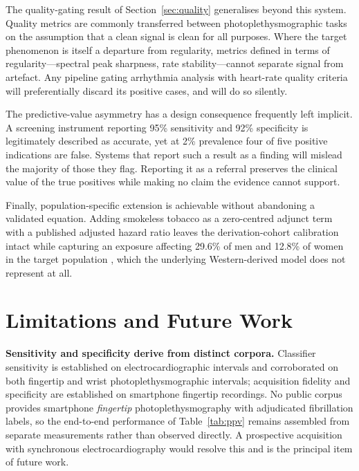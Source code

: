 \documentclass[conference]{IEEEtran}
\begin{document}
The quality-gating result of Section~\ref{sec:quality} generalises beyond this
system. Quality metrics are commonly transferred between photoplethysmographic
tasks on the assumption that a clean signal is clean for all purposes. Where the
target phenomenon is itself a departure from regularity, metrics defined in terms
of regularity---spectral peak sharpness, rate stability---cannot separate signal from
artefact. Any pipeline gating arrhythmia analysis with heart-rate quality criteria
will preferentially discard its positive cases, and will do so silently.

The predictive-value asymmetry has a design consequence frequently left implicit.
A screening instrument reporting 95\% sensitivity and 92\% specificity is
legitimately described as accurate, yet at 2\% prevalence four of five positive
indications are false. Systems that report such a result as a finding will
mislead the majority of those they flag. Reporting it as a referral preserves the
clinical value of the true positives while making no claim the evidence cannot
support.

Finally, population-specific extension is achievable without abandoning a validated
equation. Adding smokeless tobacco as a zero-centred adjunct term with a published
adjusted hazard ratio leaves the derivation-cohort calibration intact while
capturing an exposure affecting 29.6\% of men and 12.8\% of women in the target
population \cite{gats2017}, which the underlying Western-derived model does not represent at all.

\section{Limitations and Future Work}

\textbf{Sensitivity and specificity derive from distinct corpora.} Classifier
sensitivity is established on electrocardiographic intervals and corroborated on both
fingertip and wrist photoplethysmographic intervals; acquisition fidelity and specificity are established on
smartphone fingertip recordings. No public corpus provides smartphone \emph{fingertip}
photoplethysmography with adjudicated fibrillation labels, so the end-to-end performance
of Table~\ref{tab:ppv} remains assembled from separate measurements rather than observed
directly. A prospective acquisition with synchronous electrocardiography would resolve
this and is the principal item of future work.
\end{document}
